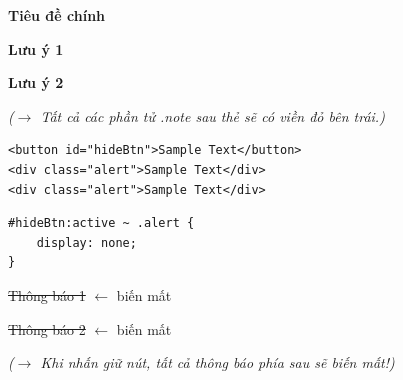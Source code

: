 \begin{browserWindow}
\sffamily\small
{\bfseries\large\textcolor{darkText}{Tiêu đề chính}} \par\vspace{4pt}
\begin{tcolorbox}[arc=0pt, colback=white, colframe=white, boxrule=0pt, boxsep=2pt, left=10pt, right=4pt, borderline west={3pt}{0pt}{red}]
\textcolor{darkText}{\textbf{Lưu ý 1}}
\end{tcolorbox}\vspace{2pt}
\begin{tcolorbox}[arc=0pt, colback=white, colframe=white, boxrule=0pt, boxsep=2pt, left=10pt, right=4pt, borderline west={3pt}{0pt}{red}]
\textcolor{darkText}{\textbf{Lưu ý 2}}
\end{tcolorbox}\vspace{4pt}
\textcolor{gray!70}{\small\textit{($\rightarrow$ Tất cả các phần tử .note sau thẻ  sẽ có viền đỏ bên trái.)}}
\end{browserWindow}

\begin{codeWindow}
\begin{lstlisting}[language=HTML5]
<button id="hideBtn">Sample Text</button>
<div class="alert">Sample Text</div>
<div class="alert">Sample Text</div>
\end{lstlisting}

\begin{lstlisting}[language=CSS3]
#hideBtn:active ~ .alert {
    display: none;
}
\end{lstlisting}
\end{codeWindow}

\begin{browserWindow}
\sffamily\small
{} \par\vspace{4pt}
\textcolor{gray!50}{\sout{Thông báo 1}} {\small\textcolor{gray!60}{$\leftarrow$ biến mất}} \par\vspace{2pt}
\textcolor{gray!50}{\sout{Thông báo 2}} {\small\textcolor{gray!60}{$\leftarrow$ biến mất}} \par\vspace{4pt}
\textcolor{gray!70}{\small\textit{($\rightarrow$ Khi nhấn giữ nút, tất cả thông báo phía sau sẽ biến mất!)}}
\end{browserWindow}

